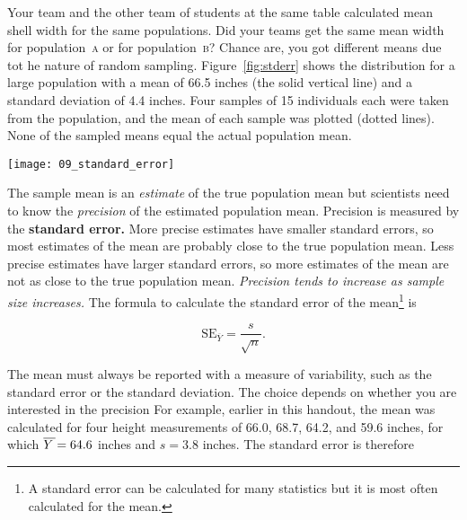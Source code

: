 \documentclass[12pt]{exam}
\newcommand*\meanY{\overline{Y\kern1.67pt}\kern-1.67pt}
\newcommand*\meansubY{\overline{Y}}
\newcommand*\popa{population~\textsc{a}} %
\newcommand*\popb{population~\textsc{b}} %
\begin{document}
\begin{questions}
Your team and the other team of students at the same table calculated mean shell width for the same populations. Did your teams get the same mean width for \popa{} or for \popb{}? Chance are, you got different means due tot he nature of random sampling.
Figure~\ref{fig:stderr} shows the distribution for a large population with a mean of 66.5 inches (the solid vertical line) and a standard deviation of 4.4 inches. Four samples of 15 individuals each were taken from the population, and the mean of each sample was plotted (dotted lines). None of the sampled means equal the actual population mean.

\hfil\begin{minipage}{0.8\textwidth}
	\texttt{[image: 09\_standard\_error]}
\end{minipage}\hfill

\bigskip

The sample mean is an \emph{estimate} of the true population mean but scientists 
need to know the \emph{precision} of the estimated population mean. Precision 
is measured by the \textbf{standard error.} More precise estimates have smaller 
standard errors, so most estimates of the mean are probably close to the true population mean. Less precise estimates have larger standard errors, so more estimates of the mean are not as close to the true population mean. \emph{Precision tends to increase as sample size increases.} The formula to calculate the standard error of the mean\footnote{A standard error can be calculated for many statistics but it is most often calculated for the mean.} is

\[ \mathrm{SE}_{\meansubY} = \frac{s}{\sqrt{n}}. \]

The mean must always be reported with a measure of variability, such as the standard error
or the standard deviation. The choice depends on whether you are interested in the precision 
For example, earlier in this handout, the mean was calculated for four height measurements 
of 66.0, 68.7, 64.2, and 59.6 inches, for which $\meanY = 64.6$ inches and $s=3.8$ inches. 
The standard error is therefore


\end{questions}
\end{document}
